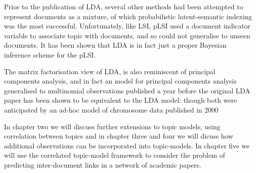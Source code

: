 Prior to the publication of LDA, several other methods had been attempted to represent documents as a mixture, of which probabilistic latent-semantic indexing \cite{Hofmann1999a} was the most successful. Unfortunately, like LSI, pLSI used a document indicator variable to associate topic with documents, and so could not generalise to unseen documents. It has been shown\cite{GiKa2003} that LDA is in fact just a proper Bayesian inference scheme for the pLSI. 

The matrix factorisation view of LDA, is also reminiscent of principal components analysis, and in fact an model for principal components analysis generalised to multinomial observations\cite{Buntine2002} published a year before the original LDA paper has been shown to be equivalent to the LDA model: though both were anticipated by an ad-hoc model of chromosome data published in 2000\cite{Pritchard2000}

In chapter two we will discuss further extensions to topic models, using correlation between topics and in chapter three and four we will dicuss how additional observations can be incorporated into topic-models. In chapter five we will use the correlated topic-model framework to consider the problem of predicting inter-document links in a network of academic papers.


